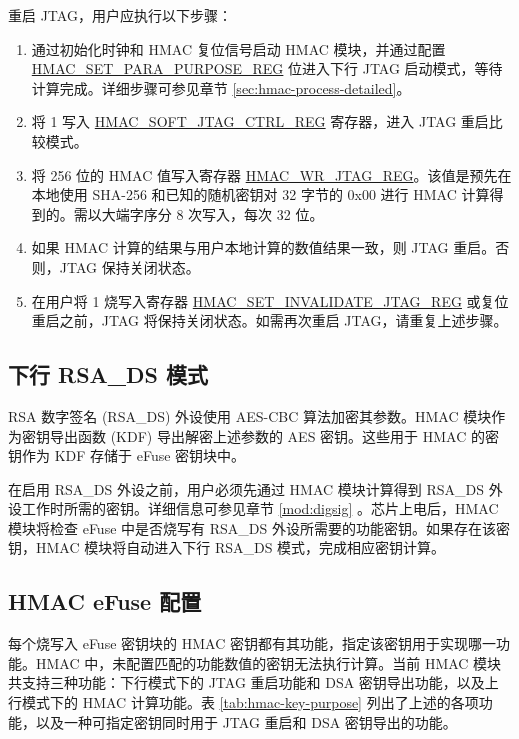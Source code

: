\documentclass[main\_\_CN.tex]{subfiles}
\begin{document}
重启 JTAG，用户应执行以下步骤：
\begin{enumerate}
    \item 通过初始化时钟和 HMAC 复位信号启动 HMAC 模块，并通过配置 \hyperref[regdesc:HMACSETPARAPURPOSEREG]{HMAC\_SET\_PARA\_PURPOSE\_REG} 位进入下行 JTAG 启动模式，等待计算完成。详细步骤可参见章节 \ref{sec:hmac-process-detailed}。
    \item 将 1 写入 \hyperref[regdesc:HMACSOFTJTAGCTRLREG]{HMAC\_SOFT\_JTAG\_CTRL\_REG} 寄存器，进入 JTAG 重启比较模式。
    \item 将 256 位的 HMAC 值写入寄存器 \hyperref[regdesc:HMACWRJTAGREG]{HMAC\_WR\_JTAG\_REG}。该值是预先在本地使用 SHA-256 和已知的随机密钥对 32 字节的 0x00 进行 HMAC 计算得到的。需以大端字序分 8 次写入，每次 32 位。
    \item 如果 HMAC 计算的结果与用户本地计算的数值结果一致，则 JTAG 重启。否则，JTAG 保持关闭状态。
    \item 在用户将 1 烧写入寄存器 \hyperref[regdesc:HMACSETINVALIDATEJTAGREG]{HMAC\_SET\_INVALIDATE\_JTAG\_REG} 或复位重启之前，JTAG 将保持关闭状态。如需再次重启 JTAG，请重复上述步骤。
    \end{enumerate}


\subsection{下行 RSA\_DS 模式}

RSA 数字签名 (RSA\_DS) 外设使用 AES-CBC 算法加密其参数。HMAC 模块作为密钥导出函数 (KDF) 导出解密上述参数的 AES 密钥。这些用于 HMAC 的密钥作为 KDF 存储于 eFuse 密钥块中。

在启用 RSA\_DS 外设之前，用户必须先通过 HMAC 模块计算得到 RSA\_DS 外设工作时所需的密钥。详细信息可参见章节 \ref{mod:digsig} \textit{}。芯片上电后，HMAC 模块将检查 eFuse 中是否烧写有 RSA\_DS 外设所需要的功能密钥。如果存在该密钥，HMAC 模块将自动进入下行 RSA\_DS 模式，完成相应密钥计算。

\subsection{HMAC eFuse 配置}
\label{sec:hmac-config-function}

每个烧写入 eFuse 密钥块的 HMAC 密钥都有其功能，指定该密钥用于实现哪一功能。HMAC 中，未配置匹配的功能数值的密钥无法执行计算。当前 HMAC 模块共支持三种功能：下行模式下的 JTAG 重启功能和 DSA 密钥导出功能，以及上行模式下的 HMAC 计算功能。表 \ref{tab:hmac-key-purpose} 列出了上述的各项功能，以及一种可指定密钥同时用于 JTAG 重启和 DSA 密钥导出的功能。
\end{document}
